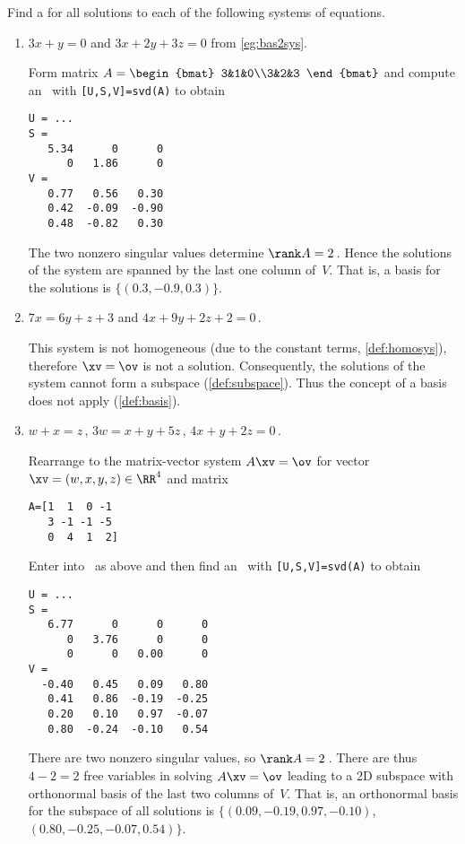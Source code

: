 \begin{example} 
Find a  for all solutions to each of the following systems of equations.
\begin{enumerate}
\item \(3x+y=0\) and \(3x+2y+3z=0\) from \cref{eg:bas2sys}.
\begin{solution} 
Form matrix \(A=\begin{bmat} 3&1&0\\3&2&3 \end{bmat}\) and compute an \svd\ with \verb|[U,S,V]=svd(A)| to obtain \twodp
\begin{verbatim}
U = ...
S =
   5.34      0      0
      0   1.86      0
V =
   0.77   0.56   0.30
   0.42  -0.09  -0.90
   0.48  -0.82   0.30
\end{verbatim}
The two nonzero singular values determine \(\rank A=2\)\,.
Hence the solutions of the system are spanned by the last one column of~\(V\).  
That is, a basis for the solutions is \(\{(0.3,-0.9,0.3)\}\).
\end{solution}

\item \(7x=6y+z+3\) and \(4x+9y+2z+2=0\)\,.
\begin{solution} 
This system is not homogeneous (due to the constant terms, \cref{def:homosys}), therefore \(\xv=\ov\) is not a solution. Consequently, the solutions of the system cannot form a subspace (\cref{def:subspace}). 
Thus the concept of a basis does not apply (\cref{def:basis}). 
\end{solution}


\item \(w+x=z\)\,,
\(3w=x+y+5z\)\,,
\(4x+y+2z=0\)\,.
\begin{solution} 
Rearrange to the matrix-vector system \(A\xv=\ov\) for vector \(\xv=(w,x,y,z)\in\RR^4\) and matrix
\begin{verbatim}
A=[1  1  0 -1
   3 -1 -1 -5
   0  4  1  2]
\end{verbatim}
\setbox\ajrqrbox\hbox{}%
\marginajrbox%
Enter into \script\ as above and then find an \svd\ with \verb|[U,S,V]=svd(A)| to obtain \twodp
\begin{verbatim}
U = ...
S =
   6.77      0      0      0
      0   3.76      0      0
      0      0   0.00      0
V =
  -0.40   0.45   0.09   0.80
   0.41   0.86  -0.19  -0.25
   0.20   0.10   0.97  -0.07
   0.80  -0.24  -0.10   0.54
\end{verbatim}
There are two nonzero singular values, so \(\rank A=2\)\,.
There are thus \(4-2=2\) free variables in solving \(A\xv=\ov\) leading to a 2D subspace with orthonormal basis of the last two columns of~\(V\).
That is, an orthonormal basis for the subspace of all solutions is \(\{(0.09,-0.19,0.97,-0.10)\), \((0.80,-0.25,-0.07,0.54)\}\). 
\end{solution}

\end{enumerate}
\end{example}







